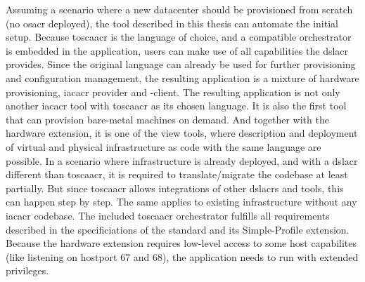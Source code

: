 Assuming a scenario where a new datacenter should be provisioned from scratch (no \gls{osacr} deployed), the tool described in this thesis can automate the initial setup. Because \gls{toscaacr} is the language of choice, and a compatible orchestrator is embedded in the application, users can make use of all capabilities the \gls{dslacr} provides. Since the original language can already be used for further provisioning and configuration management, the resulting application is a mixture of hardware provisioning, \gls{iacacr} provider and -client.
\newline
The resulting application is not only another \gls{iacacr} tool with \gls{toscaacr} as its chosen language. It is also the first tool that can provision bare-metal machines on demand. And together with the hardware extension, it is one of the view tools, where description and deployment of virtual and physical infrastructure as code with the same language are possible.
\newline
In a scenario where infrastructure is already deployed, and with a \gls{dslacr} different than \gls{toscaacr}, it is required to translate/migrate the codebase at least partially. But since \gls{toscaacr} allows integrations of other \gls{dslacr}s and tools, this can happen step by step. The same applies to existing infrastructure without any \gls{iacacr} codebase.
\newline\smallskip
The included \gls{toscaacr} orchestrator fulfills all requirements described in the specificiations of the standard and its Simple-Profile extension. Because the hardware extension requires low-level access to some host capabilites (like listening on hostport 67 and 68), the application needs to run with extended privileges.



